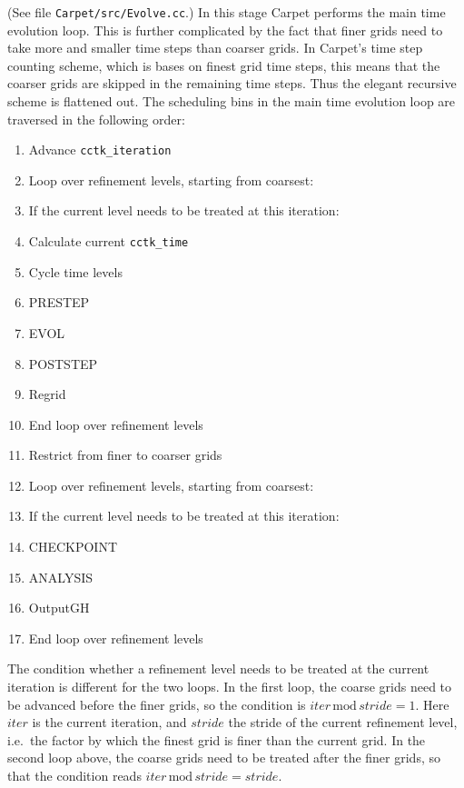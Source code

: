 \documentclass{article}
\begin{document}
   (See file \texttt{Carpet/src/Evolve.cc}.)  In this stage Carpet
   performs the main time evolution loop.  This is further complicated
   by the fact that finer grids need to take more and smaller time
   steps than coarser grids.  In Carpet's time step counting scheme,
   which is bases on finest grid time steps, this means that the
   coarser grids are skipped in the remaining time steps.  Thus the
   elegant recursive scheme is flattened out.  The scheduling bins in
   the main time evolution loop are traversed in the following order:
\begin{enumerate}
\itemsep 0pt
\item
   Advance \texttt{cctk\_iteration}
\item
   Loop over refinement levels, starting from coarsest:
\item \quad
   If the current level needs to be treated at this iteration:
\item \quad \quad
   Calculate current \texttt{cctk\_time}
\item \quad \quad
   Cycle time levels
\item \quad \quad
   PRESTEP
\item \quad \quad
   EVOL
\item \quad \quad
   POSTSTEP
\item \quad \quad
   Regrid
\item
   End loop over refinement levels
\item
   Restrict from finer to coarser grids
\item
   Loop over refinement levels, starting from coarsest:
\item \quad
   If the current level needs to be treated at this iteration:
\item \quad \quad
   CHECKPOINT
\item \quad \quad
   ANALYSIS
\item \quad \quad
   OutputGH
\item
   End loop over refinement levels
\end{enumerate}

   The condition whether a refinement level needs to be treated at the
   current iteration is different for the two loops.  In the first
   loop, the coarse grids need to be advanced before the finer grids,
   so the condition is $iter \,\mathrm{mod}\, stride = 1$.  Here
   $iter$ is the current iteration, and $stride$ the stride of the
   current refinement level, i.e.\ the factor by which the finest grid
   is finer than the current grid.  In the second loop above, the
   coarse grids need to be treated after the finer grids, so that the
   condition reads $iter \,\mathrm{mod}\, stride = stride$.
\end{document}

